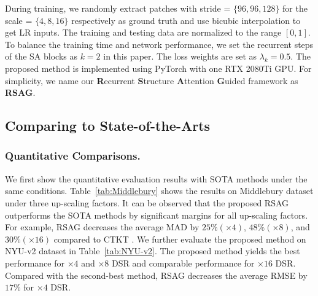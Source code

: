 \documentclass[letterpaper]{article} %
\begin{document}
During training, we randomly extract patches with stride = $\{96,96,128\}$ for the scale = $\{4,8,16\}$ respectively as ground truth and use bicubic interpolation to get LR inputs. The training and testing data are normalized to the range $[0,1]$. 
To balance the training time and network performance, we set the recurrent steps of the SA blocks as $k=2$ in this paper.
The loss weights are set as $\lambda _{k}=0.5$. The proposed method is implemented using PyTorch with one RTX 2080Ti GPU. For simplicity, we name our \textbf{R}ecurrent \textbf{S}tructure \textbf{A}ttention \textbf{G}uided framework as \textbf{RSAG}.

\subsection{Comparing to State-of-the-Arts}
\subsubsection{Quantitative Comparisons.} 
We first show the quantitative evaluation results with SOTA methods under the same conditions. Table~\ref{tab:Middlebury} shows the results on Middlebury dataset under three up-scaling factors. It can be observed that the proposed RSAG outperforms the SOTA methods by significant margins for all up-scaling factors. For example, RSAG decreases the average MAD by $25\% (\times4)$, $48\% (\times8)$, and $30\% (\times16)$ compared to  CTKT \cite{sun2021learning}. We further evaluate the proposed method on NYU-v2 dataset in Table~\ref{tab:NYU-v2}. The proposed method yields the best performance for $\times4$ and $\times8$ DSR and comparable performance for $\times16$ DSR. Compared with the second-best method, RSAG decreases the average RMSE by $17\%$ for $\times4$ DSR. 



\begin{table}[t]
	\centering
\caption{Quantitative comparisons (in RMSE) on Lu dataset and RGB-D-D dataset.}\label{tab:RGB-D-D}
\end{table}
\end{document}
